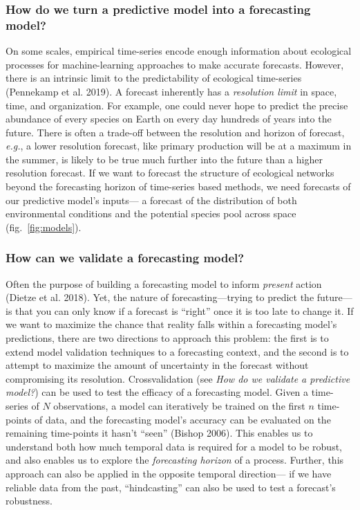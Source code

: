 \documentclass[11pt]{article}
\begin{document}
\hypertarget{how-do-we-turn-a-predictive-model-into-a-forecasting-model}{%
\subsubsection{How do we turn a predictive model into a forecasting
model?}\label{how-do-we-turn-a-predictive-model-into-a-forecasting-model}}

On some scales, empirical time-series encode enough information about
ecological processes for machine-learning approaches to make accurate
forecasts. However, there is an intrinsic limit to the predictability of
ecological time-series (Pennekamp et al. 2019). A forecast inherently
has a \emph{resolution limit} in space, time, and organization. For
example, one could never hope to predict the precise abundance of every
species on Earth on every day hundreds of years into the future. There
is often a trade-off between the resolution and horizon of forecast,
\emph{e.g.}, a lower resolution forecast, like primary production will
be at a maximum in the summer, is likely to be true much further into
the future than a higher resolution forecast. If we want to forecast the
structure of ecological networks beyond the forecasting horizon of
time-series based methods, we need forecasts of our predictive model's
inputs--- a forecast of the distribution of both environmental
conditions and the potential species pool across space
(fig.~\ref{fig:models}).

\hypertarget{how-can-we-validate-a-forecasting-model}{%
\subsubsection{How can we validate a forecasting
model?}\label{how-can-we-validate-a-forecasting-model}}

Often the purpose of building a forecasting model to inform
\emph{present} action (Dietze et al. 2018). Yet, the nature of
forecasting---trying to predict the future---is that you can only know
if a forecast is ``right'' once it is too late to change it. If we want
to maximize the chance that reality falls within a forecasting model's
predictions, there are two directions to approach this problem: the
first is to extend model validation techniques to a forecasting context,
and the second is to attempt to maximize the amount of uncertainty in
the forecast without compromising its resolution. Crossvalidation (see
\emph{How do we validate a predictive model?}) can be used to test the
efficacy of a forecasting model. Given a time-series of \(N\)
observations, a model can iteratively be trained on the first \(n\)
time-points of data, and the forecasting model's accuracy can be
evaluated on the remaining time-points it hasn't ``seen'' (Bishop 2006).
This enables us to understand both how much temporal data is required
for a model to be robust, and also enables us to explore the
\emph{forecasting horizon} of a process. Further, this approach can also
be applied in the opposite temporal direction--- if we have reliable
data from the past, ``hindcasting'' can also be used to test a
forecast's robustness.
\end{document}
